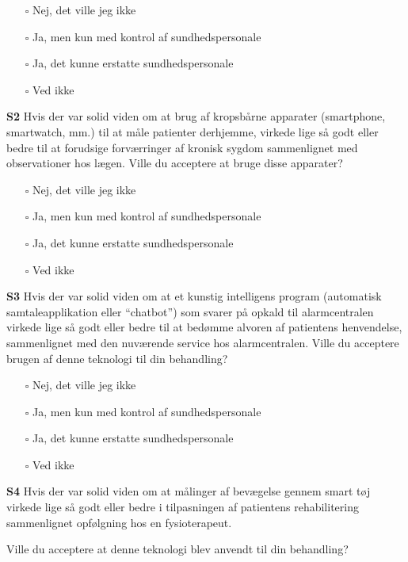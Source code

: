 \documentclass[
]{article}
\providecommand{\tightlist}{%
  \setlength{\itemsep}{0pt}\setlength{\parskip}{0pt}}
\begin{document}
\begin{itemize}
\tightlist
\item[$\square$]
  Nej, det ville jeg ikke
\item[$\square$]
  Ja, men kun med kontrol af sundhedspersonale
\item[$\square$]
  Ja, det kunne erstatte sundhedspersonale
\item[$\square$]
  Ved ikke
\end{itemize}

\textbf{S2} Hvis der var solid viden om at brug af kropsbårne apparater
(smartphone, smartwatch, mm.) til at måle patienter derhjemme, virkede
lige så godt eller bedre til at forudsige forværringer af kronisk sygdom
sammenlignet med observationer hos lægen. Ville du acceptere at bruge
disse apparater?

\begin{itemize}
\tightlist
\item[$\square$]
  Nej, det ville jeg ikke
\item[$\square$]
  Ja, men kun med kontrol af sundhedspersonale
\item[$\square$]
  Ja, det kunne erstatte sundhedspersonale
\item[$\square$]
  Ved ikke
\end{itemize}

\textbf{S3} Hvis der var solid viden om at et kunstig intelligens
program (automatisk samtaleapplikation eller ``chatbot'') som svarer på
opkald til alarmcentralen virkede lige så godt eller bedre til at
bedømme alvoren af patientens henvendelse, sammenlignet med den
nuværende service hos alarmcentralen. Ville du acceptere brugen af denne
teknologi til din behandling?

\begin{itemize}
\tightlist
\item[$\square$]
  Nej, det ville jeg ikke
\item[$\square$]
  Ja, men kun med kontrol af sundhedspersonale
\item[$\square$]
  Ja, det kunne erstatte sundhedspersonale
\item[$\square$]
  Ved ikke
\end{itemize}

\textbf{S4} Hvis der var solid viden om at målinger af bevægelse gennem
smart tøj virkede lige så godt eller bedre i tilpasningen af patientens
rehabilitering sammenlignet opfølgning hos en fysioterapeut.

Ville du acceptere at denne teknologi blev anvendt til din behandling?
\end{document}
